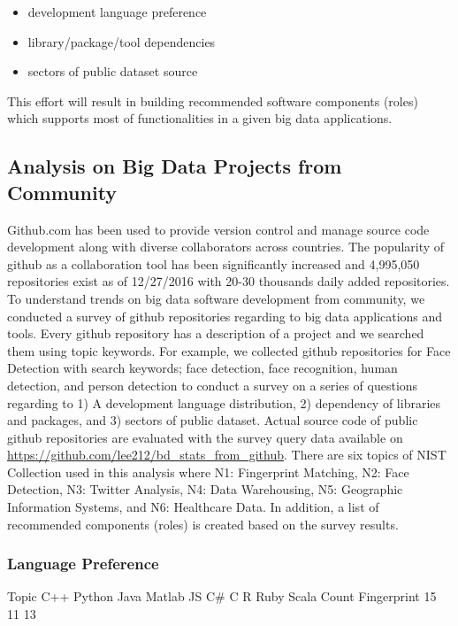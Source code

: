 \documentclass[9pt,twocolumn,twoside]{styles/osajnl}
\begin{document}
\begin{itemize}
\item development language preference
\item library/package/tool dependencies
\item sectors of public dataset source
\end{itemize}

This effort will result in building recommended software components (roles) which supports most of functionalities in a given big data applications.

\subsection{Analysis on Big Data Projects from Community}

Github.com has been used to provide version control and manage source
code development along with diverse collaborators across
countries. The popularity of github as a collaboration tool has been
significantly increased and 4,995,050 repositories exist as of
12/27/2016 with 20-30 thousands daily added repositories. To
understand trends on big data software development from community, we
conducted a survey of github repositories regarding to big data
applications and tools. Every github repository has a description of a
project and we searched them using topic keywords. For example, we
collected github repositories for Face Detection with search keywords;
face detection, face recognition, human detection, and person
detection to conduct a survey on a series of questions regarding to 1)
A development language distribution, 2) dependency of libraries and
packages, and 3) sectors of public dataset. Actual source code of
public github repositories are evaluated with the survey query data
available on \url{https://github.com/lee212/bd_stats_from_github}. There are
six topics of NIST Collection used in this analysis where N1:
Fingerprint Matching, N2: Face Detection, N3: Twitter Analysis, N4:
Data Warehousing, N5: Geographic Information Systems, and N6:
Healthcare Data. In addition, a list of recommended components (roles)
is created based on the survey results.

\subsubsection{Language Preference}

Topic
	C++
	Python
	Java
	Matlab
	JS
	C\#
	C
	R
	Ruby
	Scala
	Count
	Fingerprint
	15%
	11%
	13%
\end{document}
